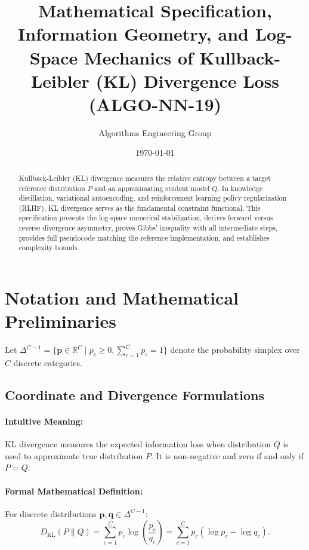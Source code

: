 \documentclass[11pt]{article}
\title{\textbf{Mathematical Specification, Information Geometry, and Log-Space Mechanics of Kullback-Leibler (KL) Divergence Loss (ALGO-NN-19)}}
\author{Algorithms Engineering Group}
\date{\today}
\begin{document}
\maketitle

\begin{abstract}
Kullback-Leibler (KL) divergence measures the relative entropy between a target reference distribution $P$ and an approximating student model $Q$. In knowledge distillation, variational autoencoding, and reinforcement learning policy regularization (RLHF), KL divergence serves as the fundamental constraint functional. This specification presents the log-space numerical stabilization, derives forward versus reverse divergence asymmetry, proves Gibbs' inequality with all intermediate steps, provides full pseudocode matching the reference implementation, and establishes complexity bounds.
\end{abstract}

\section{Notation and Mathematical Preliminaries}
\label{sec:notation}

Let $\Delta^{C-1} = \{\mathbf{p} \in \mathbb{R}^C \mid p_c \ge 0, \sum_{c=1}^C p_c = 1\}$ denote the probability simplex over $C$ discrete categories.

\subsection{Coordinate and Divergence Formulations}
\paragraph{Intuitive Meaning:} KL divergence measures the expected information loss when distribution $Q$ is used to approximate true distribution $P$. It is non-negative and zero if and only if $P = Q$.

\paragraph{Formal Mathematical Definition:}
For discrete distributions $\mathbf{p}, \mathbf{q} \in \Delta^{C-1}$:
\begin{equation}
\label{eq:kl_def}
D_{\mathrm{KL}}(P \parallel Q) = \sum_{c=1}^C p_c \log\left(\frac{p_c}{q_c}\right) = \sum_{c=1}^C p_c (\log p_c - \log q_c).
\end{equation}
\end{document}
